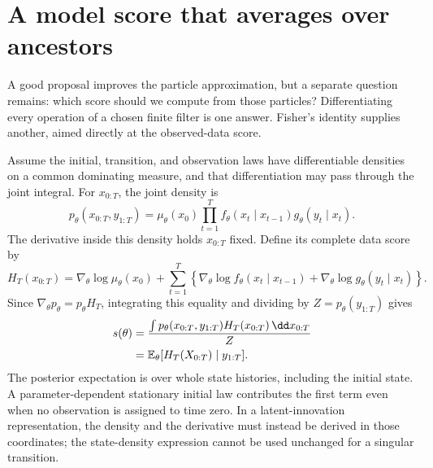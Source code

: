 \section{A model score that averages over ancestors}
\label{sec:fisher}

A good proposal improves the particle approximation, but a separate question
remains: which score should we compute from those particles? Differentiating
every operation of a chosen finite filter is one answer. Fisher's identity
supplies another, aimed directly at the observed-data score.

Assume the initial, transition, and observation laws have differentiable
densities on a common dominating measure, and that differentiation may pass
through the joint integral. For $x_{0:T}$, the joint density is
\begin{equation}
 p_\theta(x_{0:T},y_{1:T})
 =\mu_\theta(x_0)\prod_{t=1}^T
       f_\theta(x_t\mid x_{t-1})g_\theta(y_t\mid x_t).
 \label{eq:joint-model-density}
\end{equation}
The derivative inside this density holds $x_{0:T}$ fixed. Define its complete
data score by
\begin{equation}
 H_T(x_{0:T})=\nabla_\theta\log\mu_\theta(x_0)
 +\sum_{t=1}^T\left\{
    \nabla_\theta\log f_\theta(x_t\mid x_{t-1})
   +\nabla_\theta\log g_\theta(y_t\mid x_t)\right\}.
 \label{eq:complete-data-score}
\end{equation}
Since $\nabla_\theta p_\theta=p_\theta H_T$, integrating this equality and
dividing by $Z=p_\theta(y_{1:T})$ gives
\begin{align}
 s(\theta)
 &=\frac{\int p_\theta(x_{0:T},y_{1:T})H_T(x_{0:T})\,\dd x_{0:T}}{Z}
 \notag\\
 &=\mathbb E_\theta[H_T(X_{0:T})\mid y_{1:T}].
 \label{eq:fisher-model-score}
\end{align}
The posterior expectation is over whole state histories, including the
initial state. A parameter-dependent stationary initial law contributes the
first term even when no observation is assigned to time zero. In a
latent-innovation representation, the density and the derivative must instead
be derived in those coordinates; the state-density expression cannot be used
unchanged for a singular transition.

